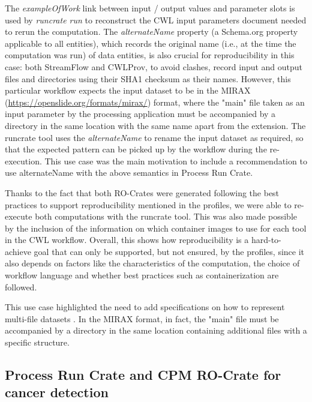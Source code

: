 \documentclass[10pt,letterpaper]{article}
\begin{document}
The \emph{exampleOfWork} link between input / output values and parameter slots is used by \emph{runcrate run} to reconstruct the CWL input parameters document needed to rerun the computation.
The
\emph{alternateName} property (a Schema.org property applicable to all entities), which records the original name (i.e., at the time the computation was run) of data entities, is also crucial for reproducibility in this case: both StreamFlow and CWLProv, to avoid clashes, record input and output files and directories using their SHA1
checksum as their names. 
However, this particular workflow expects the input dataset to be in the MIRAX (\url{https://openslide.org/formats/mirax/}) format, where the "main" file taken as an input parameter by the processing application must be accompanied by a directory in the same location with the same name apart from the extension.
The runcrate tool uses the \emph{alternateName} to rename the input dataset as required, so that the expected pattern can be picked up by the workflow during the re-execution.
This use case was the main motivation to include a recommendation to use alternateName with the above semantics in Process Run Crate.

Thanks to the fact that both RO-Crates were generated following the best practices to support reproducibility mentioned in the profiles, we were able to re-execute both computations with the runcrate tool.
This was also made possible by the inclusion of the information on which container images to use for each tool in the CWL workflow.
Overall, this shows how reproducibility is a hard-to-achieve goal that can only be supported, but not ensured, by the profiles, since it also depends on factors like the characteristics of the computation, the choice of workflow language and whether best practices such as containerization are followed.

This use case highlighted the need to add specifications on how to represent multi-file datasets \cite[section Representing multi-file objects]{Workflow Run RO-Crate working group 2023a}. In the MIRAX format, in fact, the "main" file must be accompanied by a directory in the same location containing additional files with a specific structure.

\subsection{Process Run Crate and CPM RO-Crate for cancer detection}\label{process-run-crate-and-cpm-ro-crate-for-cancer-detection}
\end{document}
